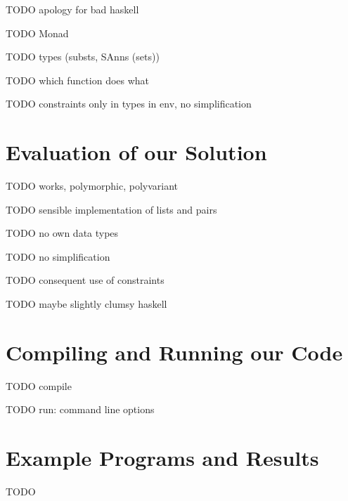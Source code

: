 \documentclass[a4paper,11pt]{article}
\begin{document}
TODO apology for bad haskell

TODO Monad

TODO types (substs, SAnns (sets))

TODO which function does what

TODO constraints only in types in env, no simplification


\section{Evaluation of our Solution}
TODO works, polymorphic, polyvariant

TODO sensible implementation of lists and pairs

TODO no own data types

TODO no simplification

TODO consequent use of constraints

TODO maybe slightly clumsy haskell


\section{Compiling and Running our Code}
TODO compile

TODO run: command line options


\section{Example Programs and Results}

TODO
\end{document}
